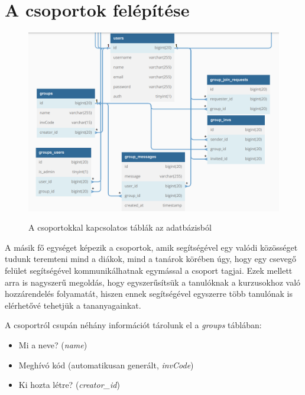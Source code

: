 \documentclass[
]{thesis-ekf}
\theoremstyle{definition}
\theoremstyle{remark}
\begin{document}
            \section{A csoportok felépítése}
            \begin{figure}[ht!]
    		        \centering
    		        \includegraphics[width=15cm]{Vizsgaztato_csoportok.png}
    		        \label{fig-db-csoportok}
                        \caption{A csoportokkal kapcsolatos táblák az adatbázisból}
    	    \end{figure}
                A másik fő egységet képezik a csoportok, amik segítségével egy valódi közösséget tudunk teremteni mind a diákok, mind a tanárok körében úgy, hogy egy csevegő felület segítségével kommunikálhatnak egymással a csoport tagjai. Ezek mellett arra is nagyszerű megoldás, hogy egyszerűsítsük a tanulóknak a kurzusokhoz való hozzárendelés folyamatát, hiszen ennek segítségével egyszerre több tanulónak is elérhetővé tehetjük a tananyagainkat.
                

                A csoportról csupán néhány információt tárolunk el a \emph{groups} táblában:
                \begin{itemize}
                    \item Mi a neve? (\emph{name})
                    \item Meghívó kód (automatikusan generált, \emph{invCode}) 
                    \item Ki hozta létre? (\emph{creator\_id})
                \end{itemize}
                
\end{document}
